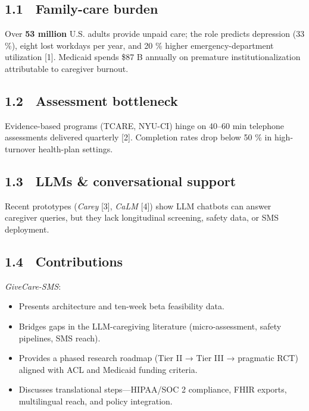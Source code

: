 \documentclass[
]{article}
\providecommand{\tightlist}{%
  \setlength{\itemsep}{0pt}\setlength{\parskip}{0pt}}
\begin{document}
\subsection{1.1 Family-care burden}\label{family-care-burden}

Over \textbf{53 million} U.S. adults provide unpaid care; the role
predicts depression (33 \%), eight lost workdays per year, and 20 \%
higher emergency-department utilization {[}1{]}. Medicaid spends \$87 B
annually on premature institutionalization attributable to caregiver
burnout.

\subsection{1.2 Assessment bottleneck}\label{assessment-bottleneck}

Evidence-based programs (TCARE, NYU-CI) hinge on 40--60 min telephone
assessments delivered quarterly {[}2{]}. Completion rates drop below 50
\% in high-turnover health-plan settings.

\subsection{1.3 LLMs \& conversational
support}\label{llms-conversational-support}

Recent prototypes (\emph{Carey} {[}3{]}, \emph{CaLM} {[}4{]}) show LLM
chatbots can answer caregiver queries, but they lack longitudinal
screening, safety data, or SMS deployment.

\subsection{1.4 Contributions}\label{contributions}

\emph{GiveCare-SMS}:

\begin{itemize}
\tightlist
\item
  Presents architecture and ten-week beta feasibility data.\\
\item
  Bridges gaps in the LLM-caregiving literature (micro-assessment,
  safety pipelines, SMS reach).\\
\item
  Provides a phased research roadmap (Tier II → Tier III → pragmatic
  RCT) aligned with ACL and Medicaid funding criteria.\\
\item
  Discusses translational steps---HIPAA/SOC 2 compliance, FHIR exports,
  multilingual reach, and policy integration.
\end{itemize}
\end{document}
